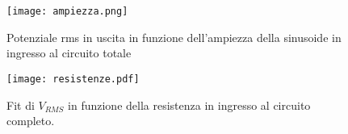 \begin{figure}[h]
	\centering
	\texttt{[image: ampiezza.png]}
	\caption{Potenziale rms in uscita in funzione dell'ampiezza della sinusoide in ingresso al circuito totale}
	\label{f:frequenza}
\end{figure}

\begin{figure}[h]
	\centering
	\texttt{[image: resistenze.pdf]}
	\caption{Fit di $V_{RMS}$ in funzione della resistenza in ingresso al circuito completo.}
	\label{f:resistenze}
\end{figure}